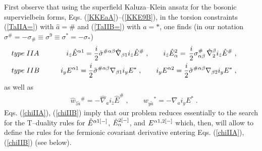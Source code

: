 \documentclass[a4paper,11pt]{article}
\begin{document}
First observe that using the superfield Kaluza--Klein ansatz 
for the bosonic supervielbein forms, Eqs. (\ref{KKEaA})--(\ref{KKE9B}), 
in the torsion constraints 
(\ref{TaIIA=}) with $ \hat{a}= \#$ and (\ref{TaIIB=}) with  
$ {a}= *$, one finds (in our notation $\sigma^{\#}=-\sigma_{\#} \equiv 
\sigma^9 \equiv \sigma^*= - \sigma_*$)
\begin{eqnarray} 
\label{chiIIA} & type \; IIA \qquad &
i_{\hat{z}}\hat{E}^{\alpha 1}= 
{i\over 2} \tilde{\sigma}^{\#  {\alpha} {\beta}}
\hat{\nabla}_{ {\beta}1} i_{\hat{z}}\hat{E}^{ {\#}}
\; , \qquad 
i_{\hat{z}}\hat{E}_{\alpha}^2 
= \, 
 {i\over 2} {\sigma}^{\#}_{ {\alpha} {\beta}} \, 
\hat{\nabla}_2^{ {\beta}} i_{\hat{z}}\hat{E}^{ {\#}} \; , 
\qquad 
\\ 
\label{chiIIB} & type \; IIB \qquad &
i_yE^{\alpha 1}= 
{i\over 2}  \tilde{\sigma}^{\#  {\alpha} {\beta}}
{\nabla}_{ {\beta}1}i_{y}{E}^{ {*}}
\; ,  \qquad 
i_y E^{\alpha 2} = 
{i\over 2}  \tilde{\sigma}^{\#  {\alpha} {\beta}}
{\nabla}_{ {\beta}2} i_{y}{E}^{ {*}}\; , \qquad 
\end{eqnarray}
as well as 
\begin{eqnarray} 
\label{wzaz} &
\hat{w}_{\hat{z} \tilde{a}}{}^{\#}= 
- \hat{\nabla}_a i_{\hat{z}}\hat{E}^{ {\#}}\; , 
 \qquad {w}_{y\tilde{a}}{}^{*}= 
- {\nabla}_a i_{y}{E}^{*}\; .
\end{eqnarray} 
Eqs. (\ref{chiIIA}), (\ref{chiIIB}) imply    
that our problem reduces essentially to the search for the 
T--duality rules for $\hat{E}^{\alpha 1 [-]}$, $\hat{E}_{\alpha}^{2[-]}$, 
and  $E^{\alpha 1,2 [-]}$ which, then, will allow to define the rules 
for the fermionic covariant derivative  entering Eqs.  (\ref{chiIIA}), 
(\ref{chiIIB}) (see below). 
\end{document}
